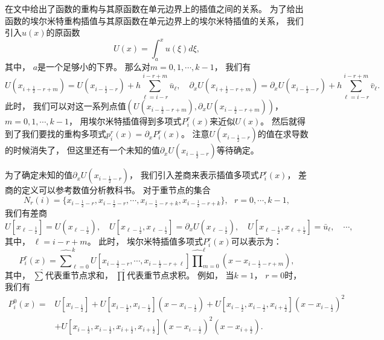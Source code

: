 在文\cite{WENO}中给出了函数的重构与其原函数在单元边界上的插值之间的关系。
为了给出函数的埃尔米特重构插值与其原函数在单元边界上的埃尔米特插值的关系，
我们引入$u(x)$的原函数
\begin{equation}
  U(x)=\int^x_a u(\xi)d\xi,
\end{equation}
其中，
$a$是一个足够小的下界。
那么对$m=0,1,\cdots,k-1$，
我们有
\begin{equation}
  \label{eq:pri-val}
  U (x_{i+\frac 12-r+m})=U(x_{i-\frac 12-r})+h\sum_{\ell=i-r}^{i-r+m}\bar u_{\ell},\quad
  {\partial_x}U(x_{i+\frac 12-r+m})={\partial_x}U(x_{i-\frac 12-r})+h\sum_{\ell=i-r}^{i-r+m}\bar v_{\ell}.
\end{equation}
此时，
我们可以对这一系列点值$(U(x_{i-\frac12-r+m}),{\partial_x}U(x_{i-\frac12-r+m}))$，
$m=0,1,\cdots,k-1$，
用埃尔米特插值得到多项式$P^r_i(x)$来近似$U(x)$。
然后就得到了我们要找的重构多项式$p^r_i(x) = {\partial_x}P^r_i(x)$。
注意$U(x_{i-\frac 12-r})$的值在求导数的时候消失了，
但这里还有一个未知的值${\partial_x}U(x_{i-\frac 12-r})$等待确定。

为了确定未知的值${\partial_x}U(x_{i-\frac 12-r})$，
我们引入差商来表示插值多项式$P^r_i(x)$，
差商的定义可以参考数值分析教科书\cite{Kreiss-book}。
对于重节点的集合
\begin{equation}
  N_{r}(i) =\{x_{i-\frac 12-r}, x_{i-\frac 12-r}, \cdots, x_{i-\frac 12-r+k}, x_{i-\frac 12-r+k}\} , \ \ \ r=0, \cdots, k-1,
\end{equation}
我们有差商
\begin{equation}
  \label{eq:2_10}
  U[x_{\ell-\frac 12}] = U(x_{\ell-\frac 12}), \quad
  U[x_{\ell-\frac 12},x_{\ell-\frac 12}] = {\partial_x}U(x_{\ell-\frac 12}), \quad
  U[x_{\ell-\frac 12},x_{\ell+\frac 12}] = \bar u_{\ell}, \quad
  \cdots,
\end{equation}
其中，
$\ell = i-r+m$。
此时，
埃尔米特插值多项式$P^r_i(x)$可以表示为：
\begin{equation}
  P^r_i(x)={\widehat\sum}_{\ell=0}^{ k}U\left[x_{i-\frac 12-r}, \cdots, x_{i-\frac 12-r+\ell}\right]
  \widehat\prod_{m=0}^{\ell}\left(x-x_{i-\frac 12-r+m}\right),
\end{equation}
其中，
$\widehat\sum$代表重节点求和，
$\widehat\prod$代表重节点求积。
例如，
当$k=1$，
$r=0$时，
我们有
\begin{equation}
  \begin{aligned}
    P^0_{i}(x) =
     & U[x_{i-\frac 12}] + U[x_{i-\frac 12},x_{i-\frac 12}](x-x_{i-\frac 12}) + U[x_{i-\frac 12},x_{i-\frac 12},x_{i+\frac 12}](x-x_{i-\frac 12})^2 \\
     & + U[x_{i-\frac 12},x_{i-\frac 12},x_{i+\frac 12},x_{i+\frac 12}](x-x_{i-\frac 12})^2(x-x_{i+\frac 12}).
  \end{aligned}
\end{equation}

